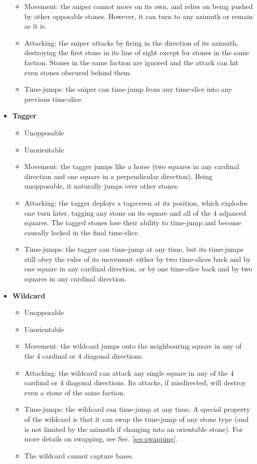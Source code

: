 \documentclass[12pt]{article}
\begin{document}
\begin{itemize}
\begin{itemize}
		\item Movement: the sniper cannot move on its own, and relies on being pushed by other opposable stones. However, it can turn to any azimuth or remain as it is.
		\item Attacking: the sniper attacks by firing in the direction of its azimuth, destroying the first stone in its line of sight except for stones in the same faction. Stones in the same faction are ignored and the attack can hit even stones obscured behind them.
		\item Time-jumps: the sniper can time-jump from any time-slice into any previous time-slice.
		\end{itemize}
	\item \textbf{Tagger}
		\begin{itemize}
		\item Unopposable
		\item Unorientable
		\item Movement: the tagger jumps like a horse (two squares in any cardinal direction and one square in a perpendicular direction). Being unopposable, it naturally jumps over other stones.
		\item Attacking: the tagger deploys a tagscreen at its position, which explodes one turn later, tagging any stone on its square and all of the $4$ adjanced squares. The tagged stones lose their ability to time-jump and become causally locked in the final time-slice.
		\item Time-jumps: the tagger can time-jump at any time, but its time-jumps still obey the rules of its movement--either by two time-slices back and by one square in any cardinal direction, or by one time-slice back and by two squares in any cardinal direction.
		\end{itemize}
	\item \textbf{Wildcard}
		\begin{itemize}
		\item Unopposable
		\item Unorientable
		\item Movement: the wildcard jumps onto the neighbouring square in any of the $4$ cardinal or $4$ diagonal directions.
		\item Attacking: the wildcard can attack any single square in any of the $4$ cardinal or $4$ diagonal directions. Its attacks, if misdirected, will destroy even a stone of the same faction.
		\item Time-jumps: the wildcard can time-jump at any time. A special property of the wildcard is that it can swap the time-jump of any stone type (and is not limited by the azimuth if changing into an orientable stone). For more details on swapping, see Sec. \ref{sec:swapping}.
		\item The wildcard cannot capture bases.
		\end{itemize}
	\end{itemize}
\end{document}
